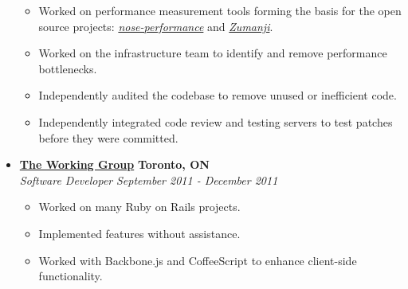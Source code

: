 \documentclass[10pt,letterpaper]{article}
\begin{document}
\begin{itemize}
    \begin{itemize}[label=\textbullet]
      \itemsep0em
      \item Worked on performance measurement tools forming the basis for the
            open source projects:
            \href{https://github.com/disqus/nose-performance}{\textit{nose-performance}}
            and \href{https://github.com/disqus/zumanji}{\textit{Zumanji}}.
      \item Worked on the infrastructure team to identify and remove performance
            bottlenecks.
      \item Independently audited the codebase to remove unused or inefficient
            code.
      \item Independently integrated code review and testing servers to test
            patches before they were committed.
    \end{itemize}


    \item[]
    {\href{http://www.twg.ca}{\textbf{The Working Group}} \hfill
      \textbf{Toronto, ON}}
    \\
    {\emph{Software Developer} \hfill \emph{September 2011 - December 2011}}

    \begin{itemize}[label=\textbullet]
      \itemsep0em
      \item Worked on many Ruby on Rails projects.
      \item Implemented features without assistance.
      \item Worked with Backbone.js and CoffeeScript to enhance client-side
      functionality.
    \end{itemize}





\end{itemize}
\end{document}

